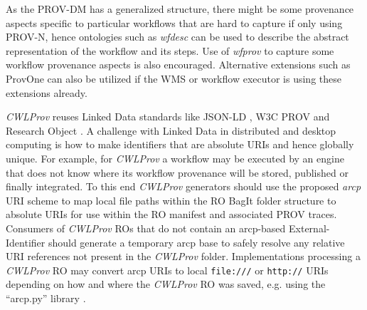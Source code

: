 \documentclass[a4paper,num-refs]{oup-contemporary}
\begin{document}
As the PROV-DM has a generalized structure, there might be some provenance aspects specific to particular workflows that are hard to capture if only using PROV-N, hence ontologies such as \textit{wfdesc} \citep{wf4ever1} can be used to describe the abstract representation of the workflow and its steps. Use of \textit{wfprov} \citep{wf4ever2} to capture some workflow provenance aspects is also encouraged. Alternative extensions such as ProvOne \citep{caoprovone} can also be utilized if the WMS or workflow executor is using these extensions already. 

\textit{CWLProv} reuses Linked Data standards like JSON-LD \citep{JSONLD}, W3C PROV \citep{PROVDM} and Research Object \citep{hettne_2014}. A challenge with Linked Data in distributed and desktop computing is how to make identifiers that are absolute URIs and hence globally unique. For example, for \textit{CWLProv} a workflow may be executed by an engine that does not know where its workflow provenance will be stored, published or finally integrated. To this end \textit{CWLProv} generators should use the proposed \emph{arcp} \citep{soilandreyes_2018} URI scheme to map local file paths within the RO BagIt folder structure to absolute URIs for use within the RO manifest and associated PROV traces. Consumers of \textit{CWLProv} ROs that do not contain an arcp-based External-Identifier should generate a temporary arcp base to safely resolve any relative URI references not present in the \textit{CWLProv} folder. Implementations processing a \textit{CWLProv} RO may convert arcp URIs to local \texttt{file:///} or \texttt{http://} URIs depending on how and where the \textit{CWLProv} RO was saved, e.g. using the ``arcp.py'' library \citep{arcp_ro2018}.
\end{document}
